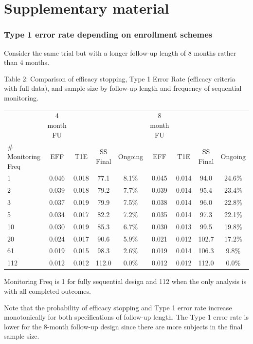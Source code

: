 \documentclass[12pt]{article}
\begin{document}
\section{Supplementary material}


\subsubsection{Type 1 error rate depending on enrollment schemes}
Consider the same trial but with a longer follow-up length of 8 months rather than 4 months. 
\begin{center}
Table 2: Comparison of efficacy stopping, Type 1 Error Rate (efficacy criteria with full data), and sample size by follow-up length and frequency of sequential monitoring.
\begin{tabular}{l | cccc|cccc}
	&	4 month FU	&		&		&		&	8 month FU	&		&		&		\\
															
\# Monitoring Freq	&	EFF	&	T1E	&	SS Final	&	Ongoing	&	EFF	&	T1E	&	SS Final	&	Ongoing	\\
\hline		
1&0.046&0.018& 77.1& 8.1\%&0.045&0.014& 94.0&24.6\%\\
2&0.039&0.018& 79.2& 7.7\%&0.039&0.014& 95.4&23.4\%\\
3&0.037&0.019& 79.9& 7.5\%&0.038&0.014& 96.0&22.8\%\\
5&0.034&0.017& 82.2& 7.2\%&0.035&0.014& 97.3&22.1\%\\
10&0.030&0.019& 85.3& 6.7\%&0.030&0.013& 99.5&19.8\%\\
20&0.024&0.017& 90.6& 5.9\%&0.021&0.012&102.7&17.2\%\\
61&0.019&0.015& 98.3& 2.6\%&0.019&0.014&106.3& 9.8\%\\
112&0.012&0.012&112.0& 0.0\%&0.012&0.012&112.0& 0.0\%\\
\end{tabular}
\end{center}
Monitoring Freq is 1 for fully sequential design and 112 when the only analysis is with all completed outcomes.

Note that the probability of efficacy stopping and Type 1 error rate increase monotonically for both specifications of follow-up length. The Type 1 error rate is lower for the 8-month follow-up design since there are more subjects in the final sample size.
\end{document}
